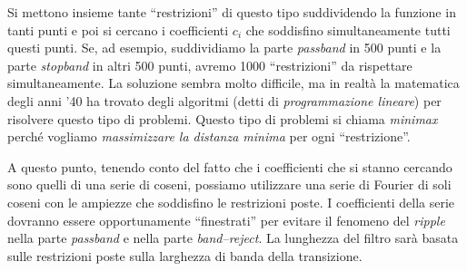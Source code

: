 Si mettono insieme tante ``restrizioni'' di questo tipo suddividendo la
funzione in tanti punti e poi si cercano i coefficienti $c_i$ che
soddisfino simultaneamente tutti questi punti. Se, ad esempio, suddividiamo la
parte \emph{passband} in 500 punti e la parte \emph{stopband} in altri 500
punti, avremo 1000 ``restrizioni'' da rispettare simultaneamente.
La soluzione sembra molto difficile, ma in realt\`a la matematica degli anni '40 
ha trovato degli algoritmi (detti di \emph{programmazione lineare})
per risolvere questo tipo di problemi.
Questo tipo di problemi si chiama \emph{minimax} perch\'e vogliamo
\emph{massimizzare la distanza minima} per ogni ``restrizione''.

A questo punto, tenendo conto del fatto che i coefficienti che si stanno
cercando sono quelli di una serie di coseni, possiamo utilizzare una serie di
Fourier di soli coseni con le ampiezze che soddisfino le restrizioni poste. I
coefficienti della serie dovranno essere opportunamente ``finestrati'' per
evitare il fenomeno del \emph{ripple} nella parte \emph{passband} e nella
parte \emph{band--reject}.
La lunghezza del filtro sar\`a basata sulle restrizioni poste sulla larghezza
di banda della transizione.

%
%
